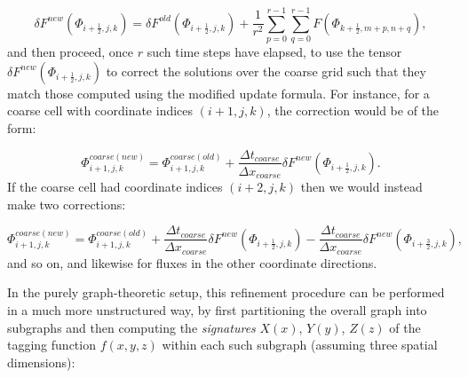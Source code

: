 \documentclass{article}
\begin{document}
\begin{equation}
\delta F^{new} \left( \Phi_{i + \frac{1}{2}, j, k} \right) = \delta F^{old} \left( \Phi_{i + \frac{1}{2}, j, k} \right) + \frac{1}{r^2} \sum_{p = 0}^{r - 1} \sum_{q = 0}^{r - 1} F \left( \Phi_{k + \frac{1}{2}, m + p, n + q} \right),
\end{equation}
and then proceed, once $r$ such time steps have elapsed, to use the tensor ${\delta F^{new} \left( \Phi_{i + \frac{1}{2}, j, k} \right)}$ to correct the solutions over the coarse grid such that they match those computed using the modified update formula. For instance, for a coarse cell with coordinate indices ${\left( i + 1, j, k \right)}$, the correction would be of the form:

\begin{equation}
\Phi_{i + 1, j, k}^{coarse (new)} = \Phi_{i + 1, j, k}^{coarse (old)} + \frac{\Delta t_{coarse}}{\Delta x_{coarse}} \delta F^{new} \left( \Phi_{i + \frac{1}{2}, j, k} \right).
\end{equation}
If the coarse cell had coordinate indices ${\left( i + 2, j, k \right)}$ then we would instead make two corrections:

\begin{equation}
\Phi_{i + 1, j, k}^{coarse (new)} = \Phi_{i + 1, j, k}^{coarse (old)} + \frac{\Delta t_{coarse}}{\Delta x_{coarse}} \delta F^{new} \left( \Phi_{i + \frac{1}{2}, j, k} \right) - \frac{\Delta t_{coarse}}{\Delta x_{coarse}} \delta F^{new} \left( \Phi_{i + \frac{3}{2}, j, k} \right),
\end{equation}
and so on, and likewise for fluxes in the other coordinate directions.

In the purely graph-theoretic setup, this refinement procedure can be performed in a much more unstructured way, by first partitioning the overall graph into subgraphs and then computing the \textit{signatures} ${X \left( x \right)}$, ${Y \left( y \right)}$, ${Z \left( z  \right)}$ of the tagging function ${f \left( x, y, z \right)}$ within each such subgraph (assuming three spatial dimensions):
\end{document}
